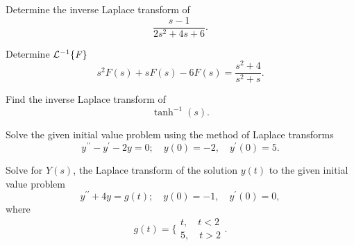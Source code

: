 \documentclass[11pt]{article}
\begin{document}
\makelabtitle


\begin{problem}
Determine the inverse Laplace transform of
\[\frac{s-1}{2s^{2}+4s+6}.\]
\end{problem}

\begin{problem}
Determine ${\cal L}^{-1}\{ {\it F }\}$ 
\begin{equation*}
s^2 F(s) +sF(s)-6F(s) = \dfrac{s^2+4}{s^2+s}.
\end{equation*}
\end{problem}


\begin{problem}
Find the inverse Laplace transform of 
\[\tanh^{-1} (s).\]
\end{problem}

\begin{problem}
Solve the given initial value problem using the method of Laplace transforms
\begin{equation*}
y^{\prime \prime} - y^{\prime}-2y =0 ; \quad y(0)=-2, \quad y^{\prime}(0) = 5.
\end{equation*}
\end{problem}


\begin{problem}
Solve for $Y(s)$, the Laplace transform of the solution $y(t)$ to the given initial value problem
\begin{equation*}
y^{\prime \prime} +4y = g(t) ; \quad y(0)=-1, \quad y^{\prime}(0) = 0,
\end{equation*}
where
\begin{equation*}
g(t) = \bigg\{ \begin{array}{ccc}
t, \quad t<2 \\
5, \quad t>2
\end{array}.
\end{equation*}
\end{problem}

% 
\end{document}

